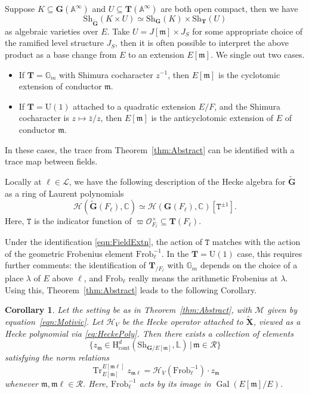 \documentclass{amsart}
\newtheorem{cor}[theorem]{Corollary}
\theoremstyle{definition}
\theoremstyle{remark}
\newcommand{\1}{\mathbf{1}}
\newcommand{\A}{\mathbb{A}}
\newcommand{\C}{\mathbb{C}}
\newcommand{\cont}{\mathrm{cont}}
\newcommand{\Fr}{\mathrm{Frob}}
\newcommand{\G}{\mathbf{G}}
\newcommand{\h}{\mathrm{H}}
\newcommand{\m}{\mathfrak{m}}
\newcommand{\mb}[1]{\mathbf{#1}}
\newcommand{\Or}{\mathcal{O}}
\newcommand{\sh}[1]{\mathcal{#1}}
\newcommand{\U}{\mathrm{U}}
\DeclareMathOperator{\Gal}{Gal}
\DeclareMathOperator{\Tr}{Tr}
\theoremstyle{definition}
\renewcommand{\G}{\mathbb{G}}
\newcommand{\bG}{\mathbf{G}}
\newcommand{\Sh}{\mathrm{Sh}}
\begin{document}
Suppose $K\subseteq\bG(\A^\infty)$ and $U\subseteq\mb{T}(\A^\infty)$ are both open compact, then we have
\begin{equation}\label{eqn:FieldExtn}
  \Sh_{\widetilde{\bG}}(K\times U)\simeq\Sh_{\bG}(K)\times\Sh_{\mb{T}}(U)
\end{equation}
as algebraic varieties over $E$. Take $U=J[\m]\times J_S$ for some appropriate choice of the ramified level structure $J_S$, then it is often possible to interpret the above product as a base change from $E$ to an extension $E[\m]$. We single out two cases.
\begin{itemize}
  \item If $\mb{T}=\G_m$ with Shimura cocharacter $z^{-1}$, then $E[\m]$ is the cyclotomic extension of conductor $\m$.
  \item If $\mb{T}=\U(1)$ attached to a quadratic extension $E/F$, and the Shimura cocharacter is $z\mapsto \bar{z}/z$, then $E[\m]$ is the anticyclotomic extension of $E$ of conductor $\m$.
\end{itemize}
In these cases, the trace from Theorem~\ref{thm:Abstract} can be identified with a trace map between fields.

Locally at $\ell\in\mathscr{L}$, we have the following description of the Hecke algebra for $\widetilde{\bG}$ as a ring of Laurent polynomials
\begin{equation}\label{eq:HeckePoly}
    \sh{H}(\widetilde{\bG}(F_\ell),\C)\simeq \sh{H}(\bG(F_\ell),\C)[\mathtt{T}^{\pm 1}].
\end{equation}
Here, $\mathtt{T}$ is the indicator function of $\varpi\Or_{F_\ell}^\times\subseteq\mb{T}(F_\ell)$.

Under the identification \eqref{eqn:FieldExtn}, the action of $\mathtt{T}$ matches with the action of the geometric Frobenius element $\mathrm{Frob}_\ell^{-1}$. In the $\mb{T}=\U(1)$ case, this requires further comments: the identification of $\mb{T}_{/F_\ell}$ with $\G_m$ depends on the choice of a place $\lambda$ of $E$ above $\ell$, and $\mathrm{Frob}_\ell$ really means the arithmetic Frobenius at $\lambda$. Using this, Theorem~\ref{thm:Abstract} leads to the following Corollary.
\begin{cor}\label{cor:Abstract}
  Let the setting be as in Theorem~\ref{thm:Abstract}, with $\sh{M}$ given by equation~\eqref{eqn:Motivic}. Let $\sh{H}_V$ be the Hecke operator attached to $\widetilde{\mb{X}}$, viewed as a Hecke polynomial via \eqref{eq:HeckePoly}. Then there exists a collection of elements
  \[
    \big\{z_\m\in\h^d_\cont(\Sh_{\bG/E[\m]},\mathbb{L})\,\big|\,\m\in\mathscr{R}\big\}
  \]
  satisfying the norm relations
  \[
    \Tr_{E[\m]}^{E[\m\ell]}z_{\m\ell}=\sh{H}_V(\mathrm{Frob}_\ell^{-1})\cdot z_\m
  \]
  whenever $\m,\m\ell\in\mathscr{R}$. Here, $\Fr_\ell^{-1}$ acts by its image in $\Gal(E[\m]/E)$.
\end{cor}
\end{document}
